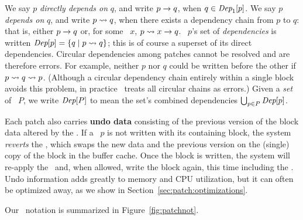 We say $p$ \emph{directly depends on} $q$, and write $p \rightarrow q$, when
 $q \in \textit{Dep}_1[p]$.
%
We say $p$ \emph{depends on} $q$, and write $p \leadsto q$, when there
 exists a dependency chain from $p$ to $q$: that is, either $p \rightarrow q$
 or, for some \patch\ $x$, $p \leadsto x \rightarrow q$.
%
\Patch\ $p$'s set of \emph{dependencies} is written $\textit{Dep}[p] = \{ q \mid
 p \leadsto q \}$; this is of course a superset of its direct dependencies.
%
Circular dependencies among patches cannot be resolved and are therefore
 errors.  For example, neither $p$ nor $q$ could be written before the
 other if $p \leadsto q \leadsto p$.
%
(Although a circular dependency chain entirely within a single block avoids
 this problem, in practice \Kudos\ treats all circular chains as errors.)
%
Given a \emph{set} of \patches\ $P$, we write $\textit{Dep}[P]$ to mean the set's
 combined dependencies $\bigcup_{p\in P} \textit{Dep}[p]$. 

\begin{comment}
\paragraph{Undo data}
%
When a \patch\ is created, the buffer cache's copy of the block data
is modified in-place to reflect the change. However,
%
some arrangements of \patches\ may require that the buffer cache
first write a block with only some \patches\ applied, and then write a
different block before being able to write the remaining \patches.
%
(An example of this is given in Section~\ref{sec:patch:examples}.)
\end{comment}

Each patch also carries \textbf{undo data} consisting of the 
 previous version of the block data altered by the \patch.
%
If a \patch\ $p$ is not written with its containing block, the system
 \emph{reverts} the \patch, which swaps the new data and the previous
 version on the (single) copy of the block in the buffer cache.
%
Once the block is written, the system will re-apply the \patch\ and, when
 allowed, write the block again, this time including the \patch.
%
Undo information adds greatly to memory and CPU utilization, but it can
 often be optimized away, as we show in Section~\ref{sec:patch:optimizations}.

Our \patch\ notation is summarized in Figure~\ref{fig:patchnot}.

